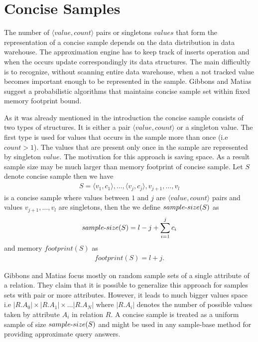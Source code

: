 \section{Concise Samples}

The number of $\langle value, count \rangle$ pairs or singletons
$values$ that form the representation of a concise sample depends on the data
distribution in data warehouse. The approximation engine has to keep track of inserts
operation and when the occurs update correspondingly its data structures.
The main difficultly is to recognize, without scanning
entire data warehouse, when a not tracked value becomes important enough to be
represented in the sample. Gibbons and Matias suggest a probabilistic
algorithms that maintains concise sample set within fixed memory
footprint bound.

As it was already mentioned in the introduction the concise sample
consists of two types of structures. It is
either a pair $\langle value, count \rangle $ or a singleton value. The first
type is used for values that occurs in the sample more than once
(i.e $count > 1$). The values that are present only once in the sample
are represented by singleton $value$. The motivation for this
approach is saving space. As a result sample size may be
much larger than memory footprint of concise sample. Let $S$ denote
concise sample then we have
\begin{align*}
  S = {\langle v_1, c_1 \rangle, \dots, \langle v_j, c_j \rangle,
    v_{j+1}, \dots, v_l }
\end{align*}
is a concise sample where values between $1$ and $j$ are $\langle
value, count \rangle$ pairs and values $v_{j+1}, \dots, v_l$ are
singletons, then the we define $sample \text{-} size(S)$ as
\begin{align*}
sample \text{-} size(S) = l - j + \sum_{i=1}^j c_i
\end{align*}
and memory $footprint(S)$ as
\begin{align*}
footprint(S) = l + j.
\end{align*}

Gibbons and Matias focus mostly on random
sample sets of a single attribute of a relation.
They claim that it is possible to generalize this
approach for samples sets with pair or more attributes. However, it
leads to much bigger values space i.e $ |R.A_0| \times |R.A_1| \times
\dots |R.A_N|$ where $|R.A_i|$ denotes the number of possible values taken by
attribute $A_i$ in relation $R$. A concise sample is treated as a uniform sample of
size $sample \text{-} size(S)$ and might be used in any sample-base method for
providing approximate query answers.

